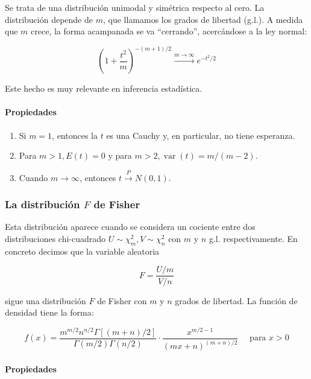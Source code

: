\documentclass[
]{article}
\providecommand{\tightlist}{%
  \setlength{\itemsep}{0pt}\setlength{\parskip}{0pt}}
\begin{document}
Se trata de una distribución unimodal y simétrica respecto al cero. La distribución depende de \(m\), que llamamos los grados de libertad (g.l.). A medida que \(m\) crece, la forma acampanada se va ``cerrando'', acercándose a la ley normal:

\[
\left(1+\frac{t^{2}}{m}\right)^{-(m+1) / 2} \xrightarrow{m \rightarrow \infty} e^{-t^{2} / 2}
\]

Este hecho es muy relevante en inferencia estadística.

\paragraph{Propiedades}\label{propiedades-1}

\begin{enumerate}
\def\labelenumi{\arabic{enumi}.}
\tightlist
\item
  Si \(m=1\), entonces la \(t\) es una Cauchy y, en particular, no tiene esperanza.
\item
  Para \(m>1, E(t)=0\) y para \(m>2, \operatorname{var}(t)=m /(m-2)\).
\item
  Cuando \(m \rightarrow \infty\), entonces \(t \xrightarrow{P} N(0,1)\).
\end{enumerate}

\subsubsection{\texorpdfstring{La distribución \(F\) de Fisher}{La distribución F de Fisher}}\label{la-distribuciuxf3n-f-de-fisher}

Esta distribución aparece cuando se considera un cociente entre dos distribuciones chi-cuadrado \(U \sim \chi_{m}^{2}, V \sim \chi_{n}^{2}\) con \(m\) y \(n\) g.l. respectivamente. En concreto decimos que la variable aleatoria

\[
F=\frac{U / m}{V / n}
\]

sigue una distribución \(F\) de Fisher con \(m\) y \(n\) grados de libertad. La función de densidad tiene la forma:

\[
f(x)=\frac{m^{m / 2} n^{n / 2} \Gamma[(m+n) / 2]}{\Gamma(m / 2) \Gamma(n / 2)} \cdot \frac{x^{m / 2-1}}{(m x+n)^{(m+n) / 2}} \quad \text { para } x>0
\]

\paragraph{Propiedades}\label{propiedades-2}
\end{document}
